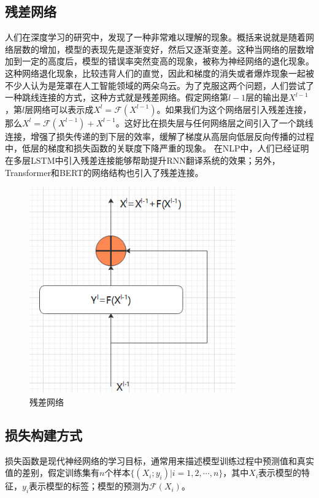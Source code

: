 \documentclass[twoside,a4paper,12pt]{book}%
\begin{document}
\subsection{残差网络}
人们在深度学习的研究中，发现了一种非常难以理解的现象。概括来说就是随着网络层数的增加，模型的表现先是逐渐变好，然后又逐渐变差。这种当网络的层数增加到一定的高度后，模型的错误率突然变高的现象，被称为神经网络的退化现象。这种网络退化现象，比较违背人们的直觉，因此和梯度的消失或者爆炸现象一起被不少人认为是笼罩在人工智能领域的两朵乌云。为了克服这两个问题，人们尝试了一种跳线连接的方式，这种方式就是残差网络。假定网络第$l-1$层的输出是$X^{l-1}$，第$l$层网络可以表示成$X^l=\mathcal{F}(X^{l-1})$。如果我们为这个网络层引入残差连接，那么$X^l=\mathcal{F}(X^{l-1})+X^{l-1}$。这好比在损失层与任何网络层之间引入了一个跳线连接，增强了损失传递的到下层的效率，缓解了梯度从高层向低层反向传播的过程中，低层的梯度和损失函数的关联度下降严重的现象。
在\gls{NLP}中，人们已经证明在多层\gls{LSTM}中引入残差连接能够帮助提升\gls{RNN}翻译系统的效果；另外，Transformer和\gls{BERT}的网络结构也引入了残差连接。
\begin{figure}[ht]
\begin{center}
\includegraphics[width=3.5in]{figures/resnet.png}
\caption{残差网络}
\label{fig:resnet}
\end{center}
\end{figure}

\subsection{损失构建方式}
损失函数是现代神经网络的学习目标，通常用来描述模型训练过程中预测值和真实值的差别，假定训练集有$n$个样本$\{(X_i;y_i)|i=1,2,\cdots,n\}$，其中$X_i$表示模型的特征，$y_i$表示模型的标签；模型的预测为$\mathcal{F}(X_i)$。
\end{document}
